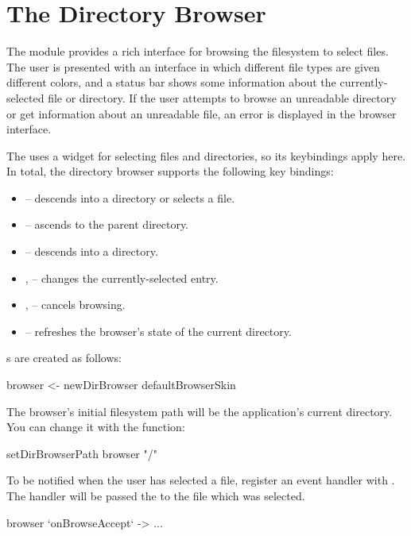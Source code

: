 \section{The Directory Browser}

The  module provides a rich interface for browsing the
filesystem to select files.  The user is presented with an interface
in which different file types are given different colors, and a status
bar shows some information about the currently-selected file or
directory.  If the user attempts to browse an unreadable directory or
get information about an unreadable file, an error is displayed in the
browser interface.

The  uses a  widget for selecting files and
directories, so its keybindings apply here.  In total, the directory
browser supports the following key bindings:

\begin{itemize}
\item {} -- descends into a directory or selects a file.
\item {} -- ascends to the parent directory.
\item {} -- descends into a directory.
\item {},  -- changes the currently-selected entry.
\item {},  -- cancels browsing.
\item {} -- refreshes the browser's state of the current
  directory.
\end{itemize}

s are created as follows:

\begin{haskellcode}
 browser <- newDirBrowser defaultBrowserSkin
\end{haskellcode}

The browser's initial filesystem path will be the application's
current directory.  You can change it with the 
function:

\begin{haskellcode}
 setDirBrowserPath browser "/"
\end{haskellcode}

To be notified when the user has selected a file, register an event
handler with .  The handler will be passed the
 to the file which was selected.

\begin{haskellcode}
 browser `onBrowseAccept` \path -> ...
\end{haskellcode}

